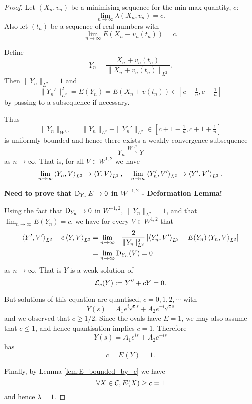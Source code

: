 \documentclass[12pt]{article}
\begin{document}
\begin{proof}
Let \((X_n, v_n)\) be a minimising sequence for the min-max quantity, \(c\):
\[
\lim_{n \to \infty} \lambda(X_n, v_n) = c.
\]
Also let \((t_n)\) be a sequence of real numbers with
\[
\lim_{n\to \infty} E(X_n + v_n(t_n)) = c.
\]

Define
\[
Y_n = \frac{X_n + v_n(t_n)}{\|X_n + v_n(t_n)\|_{L^2}}.
\]
Then \(\|Y_n\|_{L^2} = 1\) and
\[
\|Y_n'\|_{L^2}^2 = E(Y_n) = E(X_n + v(t_n)) \in [c-\tfrac{1}{n}, c + \tfrac{1}{n}]
\]
by passing to a subsequence if necessary.

Thus
\[
\|Y_n\|_{W^{1,2}} = \|Y_n\|_{L^2} + \|Y_n'\|_{L^2} \in [c+1-\tfrac{1}{n}, c + 1 + \tfrac{1}{n}]
\]
is uniformly bounded and hence there exists a weakly convergence subsequence
\[
Y_n \overset{W^{1,2}}{\rightharpoonup} Y
\]
as \(n \to \infty\). That is, for all \(V \in W^{1,2}\) we have
\[
\lim_{n\to \infty} \left\langle{Y_n},{V}\right\rangle_{L^2} \to \left\langle{Y},{V}\right\rangle_{L^2}, \quad \lim_{n\to \infty} \left\langle{Y_n'},{V'}\right\rangle_{L^2} \to \left\langle{Y'},{V'}\right\rangle_{L^2}.
\]

\textbf{Need to prove that \(\operatorname{D}_{Y_n} E \to 0\) in \(W^{-1,2}\) - Deformation Lemma!}

Using the fact that \(\operatorname{D}_{Y_n} \to 0\) in \(W^{-1,2}\), \(\|Y_n\|_{L^2} = 1\), and that \(\lim_{n\to\infty} E(Y_n) = c\), we have for every \(V \in W^{1,2}\) that
\[
\begin{split}
\left\langle{Y'},{V'}\right\rangle_{L^2} - c \left\langle{Y},{V}\right\rangle_{L^2} &= \lim_{n\to \infty} -\frac{2}{\|Y_n\|_{L^2}^2} \left[\left\langle{Y_n'},{V'}\right\rangle_{L^2} - E(Y_n) \left\langle{Y_n},{V}\right\rangle_{L^2}\right] \\
&= \lim_{n\to \infty} \operatorname{D}_{Y_n} (V) = 0
\end{split}
\]
as \(n \to \infty\). That is \(Y\) is a weak solution of
\[
\operatorname{\mathcal{L}}_c(Y) := Y'' + c Y = 0.
\]

But solutions of this equation are quantised, \(c = 0, 1, 2, \cdots\) with
\[
Y(s) = A_1 e^{i \sqrt{c} s} + A_2 e^{-i \sqrt{c} s}
\]
and we observed that \(c \geq 1/2\). Since the ovals have \(E = 1\), we may also assume that \(c \leq 1\), and hence quantisation implies \(c = 1\). Therefore
\[
Y(s) = A_1 e^{is} + A_2 e^{-is}
\]
has
\[
c = E(Y) = 1.
\]

Finally, by Lemma \ref{lem:E_bounded_by_c} we have
\[
\forall X \in \operatorname{\mathcal{C}}, E(X) \geq c = 1
\]
and hence \(\lambda = 1\).
\end{proof}
\end{document}
